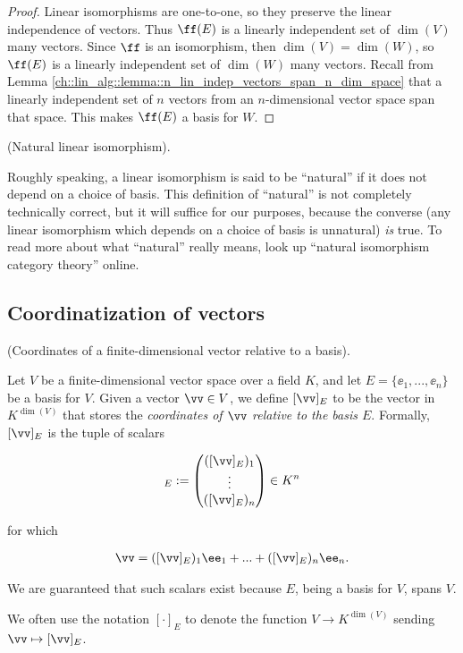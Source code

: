 \begin{proof}
    Linear isomorphisms are one-to-one, so they preserve the linear independence of vectors. Thus $\ff(E)$ is a linearly independent set of $\dim(V)$ many vectors. Since $\ff$ is an isomorphism, then $\dim(V) = \dim(W)$, so $\ff(E)$ is a linearly independent set of $\dim(W)$ many vectors. Recall from Lemma \ref{ch::lin_alg::lemma::n_lin_indep_vectors_span_n_dim_space} that a linearly independent set of $n$ vectors from an $n$-dimensional vector space span that space. This makes $\ff(E)$ a basis for $W$.
\end{proof}

\begin{defn}
\label{ch::lin_alg::defn::natural_iso}
    (Natural linear isomorphism).
    
    Roughly speaking, a linear isomorphism is said to be ``natural'' if it does not depend on a choice of basis. This definition of ``natural'' is not completely technically correct, but it will suffice for our purposes, because the converse (any linear isomorphism which depends on a choice of basis is unnatural) \textit{is} true. To read more about what ``natural'' really means, look up ``natural isomorphism category theory'' online.
\end{defn}

\newpage

\subsection*{Coordinatization of vectors}

\begin{defn}
\label{ch::lin_alg::defn::coordinates_relative_to_basis}
    (Coordinates of a finite-dimensional vector relative to a basis).
    
    Let $V$ be a finite-dimensional vector space over a field $K$, and let $E = \{\ee_1, ..., \ee_n\}$ be a basis for $V$. Given a vector $\vv \in V$, we define $[\vv]_E$ to be the vector in $K^{\dim(V)}$ that stores the \textit{coordinates of $\vv$ relative to the basis $E$}. Formally, $[\vv]_E$ is the tuple of scalars 
    
    \begin{align*}
        [\vv]_E := \begin{pmatrix} ([\vv]_E)_1 \\ \vdots \\ ([\vv]_E)_n \end{pmatrix} \in K^n
    \end{align*}
    
    for which
    
    \begin{align*}
        \vv = ([\vv]_E)_1 \ee_1 + ... + ([\vv]_E)_n \ee_n.
    \end{align*}
    
    We are guaranteed that such scalars exist because $E$, being a basis for $V$, spans $V$.

    We often use the notation $[\cdot]_E$ to denote the function $V \rightarrow K^{\dim(V)}$ sending $\vv \mapsto [\vv]_E$.
\end{defn}

